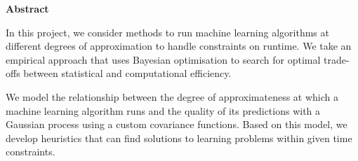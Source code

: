 \newpage
{\Huge \bf Abstract}
\vspace{24pt} 

\onehalfspacing

In this project, we consider methods to run machine learning algorithms at different degrees of approximation to handle constraints on runtime. We take an empirical approach that uses Bayesian optimisation to search for optimal trade-offs between statistical and computational efficiency. 

We model the relationship between the degree of approximateness at which a machine learning algorithm runs and the quality of its predictions with a Gaussian process using a custom covariance functions. Based on this model, we develop heuristics that can find solutions to learning problems within given time constraints.

\singlespacing

\newpage
\vspace*{\fill}
